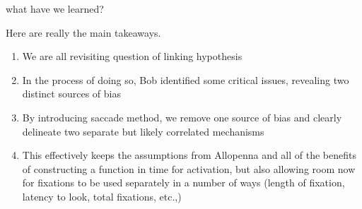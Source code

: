 \documentclass{article}
\begin{document}
what have we learned?

Here are really the main takeaways.

\begin{singlespace}
\begin{enumerate}
\vspace{-2mm}
\item We are all revisiting question of linking hypothesis
\item In the process of doing so, Bob identified some critical issues, revealing two distinct sources of bias
\item By introducing saccade method, we remove one source of bias and clearly delineate two separate but likely correlated mechanisms
\item This effectively keeps the assumptions from Allopenna and all of the benefits of constructing a function in time for activation, but also allowing room now for fixations to be used separately in a number of ways (length of fixation, latency to look, total fixations, etc.,)
\end{enumerate}
\end{singlespace}
\end{document}
